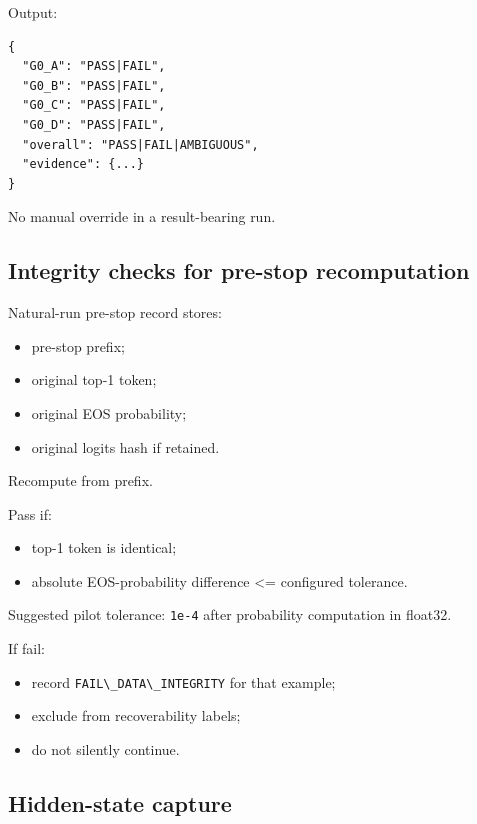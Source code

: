 Output:

\begin{lstlisting}
{
  "G0_A": "PASS|FAIL",
  "G0_B": "PASS|FAIL",
  "G0_C": "PASS|FAIL",
  "G0_D": "PASS|FAIL",
  "overall": "PASS|FAIL|AMBIGUOUS",
  "evidence": {...}
}
\end{lstlisting}

No manual override in a result-bearing run.

\subsection{Integrity checks for pre-stop recomputation}\label{integrity-checks-for-pre-stop-recomputation}

Natural-run pre-stop record stores:

\begin{itemize}
\tightlist
\item
  pre-stop prefix;
\item
  original top-1 token;
\item
  original EOS probability;
\item
  original logits hash if retained.
\end{itemize}

Recompute from prefix.

Pass if:

\begin{itemize}
\tightlist
\item
  top-1 token is identical;
\item
  absolute EOS-probability difference \textless= configured tolerance.
\end{itemize}

Suggested pilot tolerance: \passthrough{\lstinline!1e-4!} after probability computation in float32.

If fail:

\begin{itemize}
\tightlist
\item
  record \passthrough{\lstinline!FAIL\_DATA\_INTEGRITY!} for that example;
\item
  exclude from recoverability labels;
\item
  do not silently continue.
\end{itemize}

\subsection{Hidden-state capture}\label{hidden-state-capture}

